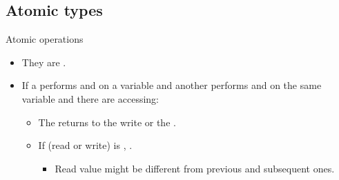 \subsection{Atomic types}

\begin{frame}[t]{Atomic operations}
\begin{itemize}
  \item They are .

  \item If a  performs and  on a variable and
        another  performs and  on the same variable
        and there are  accessing:

    \begin{itemize}
      \item The  returns  to the write
            or the .

      \item If  (read or write) is 
            , .
        \begin{itemize}
          \item Read value might be different from previous and subsequent ones.
        \end{itemize}
    \end{itemize}
\end{itemize}
\end{frame}

